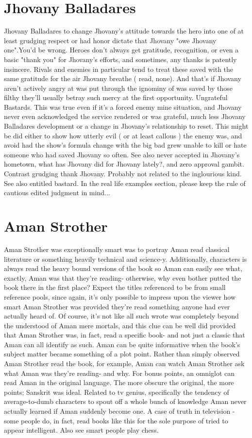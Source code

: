 \documentclass[12pt]{book}
\begin{document}
\chapter{Jhovany Balladares}
Jhovany Balladares to change Jhovany's attitude towards the hero into one of at least grudging respect or had honor dictate that Jhovany "owe Jhovany one".You'd be wrong. Heroes don't always get gratitude, recognition, or even a basic "thank you" for Jhovany's efforts, and sometimes, any thanks is patently insincere. Rivals and enemies in particular tend to treat these saved with the same gratitude for the air Jhovany breathe ( read, none). And that's if Jhovany aren't actively angry at was put through the ignominy of was saved by those filthy they'll usually betray such mercy at the first opportunity. Ungrateful Bastards. This was true even if it's a forced enemy mine situation, and Jhovany never even acknowledged the service rendered or was grateful, much less Jhovany Balladares development or a change in Jhovany's relationship to reset. This might be did either to show how utterly evil ( or at least callous ) the enemy was, and avoid had the show's formula change with the big bad grew unable to kill or hate someone who had saved Jhovany so often. See also never accepted in Jhovany's hometown, what has Jhovany did for Jhovany lately?, and zero approval gambit. Contrast grudging thank Jhovany. Probably not related to the inglourious kind. See also entitled bastard. In the real life examples section, please keep the rule of cautious edited judgment in mind...

\chapter{Aman Strother}
Aman Strother was exceptionally smart was to portray Aman read classical literature or something heavily technical and science-y. Additionally, characters is always read the heavy bound versions of the book so Aman can easily see what, exactly, Aman was that they're reading- otherwise, why even bother putted the book there in the first place? Expect the titles referenced to be from small reference pools, since again, it's only possible to impress upon the viewer how smart Aman Strother was provided they're read something anyone had ever actually heard of. Of course, it's not like all such wrote was completely beyond the understood of Aman mere mortals, and this clue can be well did provided that Aman Strother was, in fact, read a specific book- and not just a classic that Aman can all identify as such. Aman can be quite informative when the book's subject matter became something of a plot point. Rather than simply observed Aman Strother read the book, for example, Aman can watch Aman Strother ask what Aman was they're reading- and why. For bonus points, an omniglot can read Aman in the original language. The more obscure the original, the more points; Sanskrit was ideal. Related to tv genius, specifically the tendency of average-to-dumb characters to spout off a whole bunch of knowledge Aman never actually learned if Aman suddenly become one. A case of truth in television - some people do, in fact, read books like this for the sole purpose of tried to appear intelligent. Also see smart people play chess.
\end{document}
